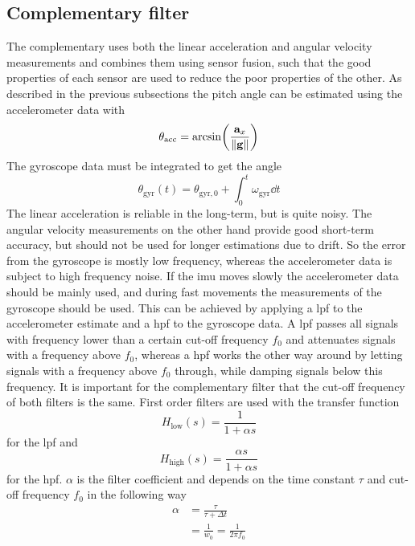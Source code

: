 \subsection{Complementary filter}
The complementary uses both the linear acceleration and angular velocity measurements and combines them using sensor fusion, such that the good properties of each sensor are used to reduce the poor properties of the other.
As described in the previous subsections the pitch angle can be estimated using the accelerometer data with
\begin{equation}
	\theta_\mathrm{acc}  = \arcsin(\frac{\vb{a}_x}{\norm{\vb{g}}})
\end{equation}
The gyroscope data must be integrated to get the angle
\begin{equation}
	\theta_\mathrm{gyr}(t) = \theta_\mathrm{gyr,0} + \int_0^t \omega_\mathrm{gyr}  \dd{t}
\end{equation}
The linear acceleration is reliable in the long-term, but is quite noisy.
The angular velocity measurements on the other hand provide good short-term accuracy, but should not be used for longer estimations due to drift.
So the error from the gyroscope is mostly low frequency, whereas the accelerometer data is subject to high frequency noise.
If the \gls{imu} moves slowly the accelerometer data should be mainly used, and during fast movements the measurements of the gyroscope should be used.
This can be achieved by applying a \gls{lpf} to the accelerometer estimate and a \gls{hpf} to the gyroscope data.
A \gls{lpf} passes all signals with frequency lower than a certain cut-off frequency $f_0$ and attenuates signals with a frequency above $f_0$, whereas a \gls{hpf} works the other way around by letting signals with a frequency above $f_0$ through, while damping signals below this frequency.
It is important for the complementary filter that the cut-off frequency of both filters is the same.
First order filters are used with the transfer function
\begin{equation}
	H_\mathrm{low} (s) = \frac{1}{1 + \alpha s}
\end{equation}
for the \gls{lpf} and
\begin{equation}
	H_\mathrm{high} (s) = \frac{\alpha s}{1 + \alpha s}
\end{equation}
for the \gls{hpf}.
$\alpha$ is the filter coefficient and depends on the time constant $\tau$ and cut-off frequency $f_0$ in the following way
\begin{align}
	\alpha & = \frac{\tau}{\tau + \Delta t}       \\
	       & = \frac{1}{w_0} = \frac{1}{2\pi f_0}
	\label{eq:filter_f0}
\end{align}
